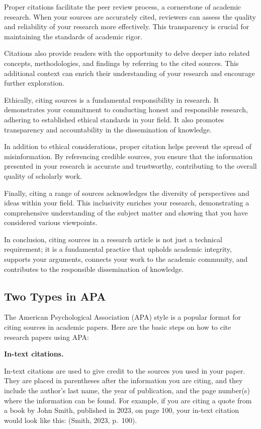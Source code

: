 \documentclass[
  b5paper]{book}
\begin{document}
Proper citations facilitate the peer review process, a cornerstone of academic research. When your sources are accurately cited, reviewers can assess the quality and reliability of your research more effectively. This transparency is crucial for maintaining the standards of academic rigor.

Citations also provide readers with the opportunity to delve deeper into related concepts, methodologies, and findings by referring to the cited sources. This additional context can enrich their understanding of your research and encourage further exploration.

Ethically, citing sources is a fundamental responsibility in research. It demonstrates your commitment to conducting honest and responsible research, adhering to established ethical standards in your field. It also promotes transparency and accountability in the dissemination of knowledge.

In addition to ethical considerations, proper citation helps prevent the spread of misinformation. By referencing credible sources, you ensure that the information presented in your research is accurate and trustworthy, contributing to the overall quality of scholarly work.

Finally, citing a range of sources acknowledges the diversity of perspectives and ideas within your field. This inclusivity enriches your research, demonstrating a comprehensive understanding of the subject matter and showing that you have considered various viewpoints.

In conclusion, citing sources in a research article is not just a technical requirement; it is a fundamental practice that upholds academic integrity, supports your arguments, connects your work to the academic community, and contributes to the responsible dissemination of knowledge.

\hypertarget{two-types-in-apa}{%
\subsection*{Two Types in APA}\label{two-types-in-apa}}

The American Psychological Association (APA) style is a popular format for citing sources in academic papers. Here are the basic steps on how to cite research papers using APA:

\textbf{In-text citations.}

In-text citations are used to give credit to the sources you used in your paper. They are placed in parentheses after the information you are citing, and they include the author's last name, the year of publication, and the page number(s) where the information can be found. For example, if you are citing a quote from a book by John Smith, published in 2023, on page 100, your in-text citation would look like this: (Smith, 2023, p.~100).
\end{document}

